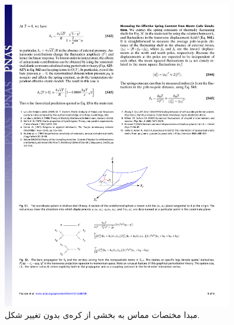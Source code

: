 \begin{figure}[h]
\begin{center}
\includegraphics[width=4in]{Figs/nelsonS1}
\caption{
مبدا مختصات مماس به بخشی از کره‌ی بدون تغییر شکل.ٓ
}
\label{fig:nelson_figs1}
\end{center}
\end{figure}

